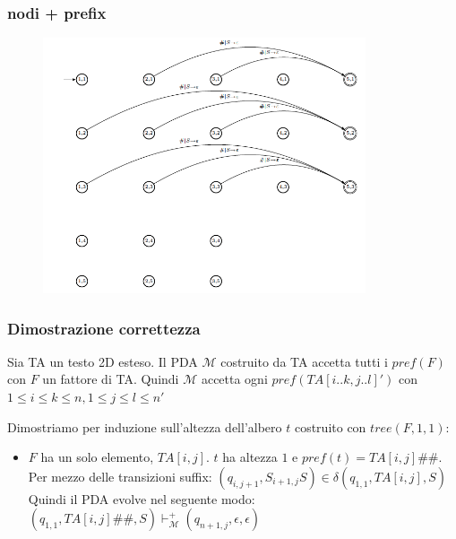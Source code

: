 \documentclass{beamer}
\begin{document}
\begin{frame}
\frametitle{nodi + prefix}
\begin{figure}[p]
    \includegraphics[width=0.85\textwidth]{pda_pre.png}
\end{figure}
\end{frame}

\begin{frame}
\frametitle{Dimostrazione correttezza}

\begin{theorem}[]
Sia TA un testo 2D esteso. Il PDA $\mathcal{M}$ costruito da TA accetta tutti i $pref(F)$ con $F$ un fattore di TA. Quindi $\mathcal{M}$ accetta ogni $pref(TA[i..k,j..l]')$ con $1 \leq i \leq k \leq n, 1 \leq j \leq l \leq n'$
\end{theorem}


Dimostriamo per induzione sull'altezza dell'albero $t$ costruito con $tree(F,1,1)$:
\begin{itemize}
\item $F$ ha un solo elemento, $TA[i,j]$. $t$ ha altezza $1$ e $pref(t) = TA[i,j]\#\#$.\\
Per mezzo delle transizioni suffix: $(q_{i,j+1},S_{i+1,j}S) \in \delta(q_{1,1},TA[i,j],S)$\\
Quindi il PDA evolve nel seguente modo:\\
$(q_{1,1},TA[i,j]\#\#,S) \vdash_\mathcal{M}^+ (q_{n+1,j},\epsilon,\epsilon)$

\end{itemize}


\end{frame}
\end{document}

